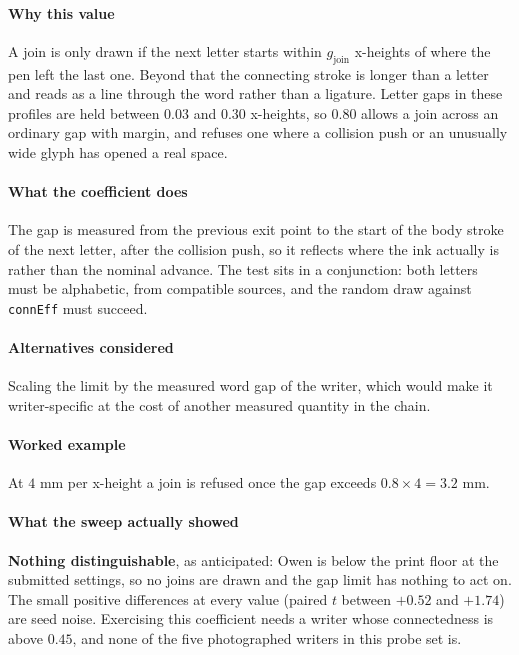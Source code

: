 \paragraph{Why this value}

A join is only drawn if the next letter starts within $g_{\text{join}}$ x-heights of where the pen left the last one. Beyond that the connecting stroke is longer than a letter and reads as a line through the word rather than a ligature. Letter gaps in these profiles are held between $0.03$ and $0.30$ x-heights, so $0.80$ allows a join across an ordinary gap with margin, and refuses one where a collision push or an unusually wide glyph has opened a real space.

\paragraph{What the coefficient does}

The gap is measured from the previous exit point to the start of the body stroke of the next letter, after the collision push, so it reflects where the ink actually is rather than the nominal advance. The test sits in a conjunction: both letters must be alphabetic, from compatible sources, and the random draw against \texttt{connEff} must succeed.

\paragraph{Alternatives considered}

Scaling the limit by the measured word gap of the writer, which would make it writer-specific at the cost of another measured quantity in the chain.

\paragraph{Worked example}

At $4$ mm per x-height a join is refused once the gap exceeds $0.8 \times 4 = 3.2$ mm.

\paragraph{What the sweep actually showed}

\textbf{Nothing distinguishable}, as anticipated: Owen is below the print floor at the submitted settings, so no joins are drawn and the gap limit has nothing to act on. The small positive differences at every value (paired $t$ between $+0.52$ and $+1.74$) are seed noise. Exercising this coefficient needs a writer whose connectedness is above $0.45$, and none of the five photographed writers in this probe set is.

